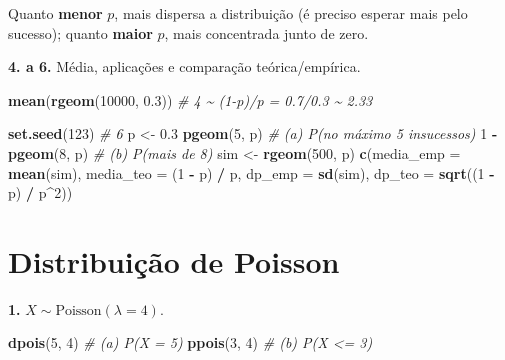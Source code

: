 \documentclass[
  portuguese,
  11pt,
  openany]{book}
\newenvironment{Shaded}{\begin{snugshade}}{\end{snugshade}}
\newcommand{\AttributeTok}[1]{\textcolor[rgb]{0.13,0.29,0.53}{#1}}
\newcommand{\CommentTok}[1]{\textcolor[rgb]{0.56,0.35,0.01}{\textit{#1}}}
\newcommand{\DecValTok}[1]{\textcolor[rgb]{0.00,0.00,0.81}{#1}}
\newcommand{\FloatTok}[1]{\textcolor[rgb]{0.00,0.00,0.81}{#1}}
\newcommand{\FunctionTok}[1]{\textcolor[rgb]{0.13,0.29,0.53}{\textbf{#1}}}
\newcommand{\NormalTok}[1]{#1}
\newcommand{\OtherTok}[1]{\textcolor[rgb]{0.56,0.35,0.01}{#1}}
\newcommand{\SpecialCharTok}[1]{\textcolor[rgb]{0.81,0.36,0.00}{\textbf{#1}}}
\begin{document}
Quanto \textbf{menor} \(p\), mais dispersa a distribuição (é preciso esperar mais pelo
sucesso); quanto \textbf{maior} \(p\), mais concentrada junto de zero.

\textbf{4. a 6.} Média, aplicações e comparação teórica/empírica.

\begin{Shaded}
\begin{Highlighting}[]
\FunctionTok{mean}\NormalTok{(}\FunctionTok{rgeom}\NormalTok{(}\DecValTok{10000}\NormalTok{, }\FloatTok{0.3}\NormalTok{))     }\CommentTok{\# 4  \textasciitilde{} (1{-}p)/p = 0.7/0.3 \textasciitilde{} 2.33}

\FunctionTok{set.seed}\NormalTok{(}\DecValTok{123}\NormalTok{)               }\CommentTok{\# 6}
\NormalTok{p }\OtherTok{\textless{}{-}} \FloatTok{0.3}
\FunctionTok{pgeom}\NormalTok{(}\DecValTok{5}\NormalTok{, p)                 }\CommentTok{\# (a) P(no máximo 5 insucessos)}
\DecValTok{1} \SpecialCharTok{{-}} \FunctionTok{pgeom}\NormalTok{(}\DecValTok{8}\NormalTok{, p)             }\CommentTok{\# (b) P(mais de 8)}
\NormalTok{sim }\OtherTok{\textless{}{-}} \FunctionTok{rgeom}\NormalTok{(}\DecValTok{500}\NormalTok{, p)}
\FunctionTok{c}\NormalTok{(}\AttributeTok{media\_emp =} \FunctionTok{mean}\NormalTok{(sim), }\AttributeTok{media\_teo =}\NormalTok{ (}\DecValTok{1} \SpecialCharTok{{-}}\NormalTok{ p) }\SpecialCharTok{/}\NormalTok{ p,}
  \AttributeTok{dp\_emp =} \FunctionTok{sd}\NormalTok{(sim),      }\AttributeTok{dp\_teo =} \FunctionTok{sqrt}\NormalTok{((}\DecValTok{1} \SpecialCharTok{{-}}\NormalTok{ p) }\SpecialCharTok{/}\NormalTok{ p}\SpecialCharTok{\^{}}\DecValTok{2}\NormalTok{))}
\end{Highlighting}
\end{Shaded}

\section{Distribuição de Poisson}\label{distribuiuxe7uxe3o-de-poisson-1}

\textbf{1.} \(X \sim \text{Poisson}(\lambda = 4)\).

\begin{Shaded}
\begin{Highlighting}[]
\FunctionTok{dpois}\NormalTok{(}\DecValTok{5}\NormalTok{, }\DecValTok{4}\NormalTok{)     }\CommentTok{\# (a) P(X = 5)}
\FunctionTok{ppois}\NormalTok{(}\DecValTok{3}\NormalTok{, }\DecValTok{4}\NormalTok{)     }\CommentTok{\# (b) P(X \textless{}= 3)}
\end{Highlighting}
\end{Shaded}
\end{document}
